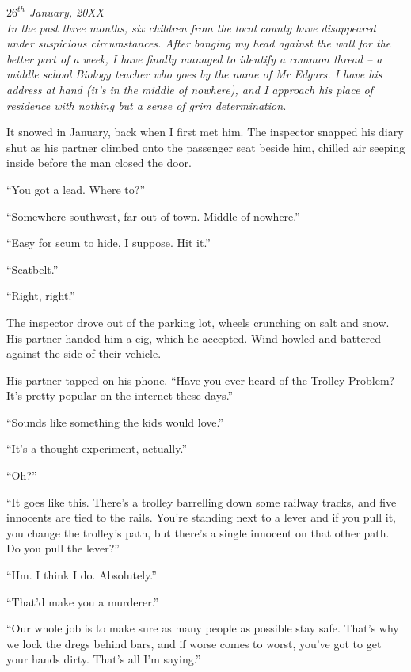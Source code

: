     \emph{$26^{th}$ January, 20XX}\\
    \emph{In the past three months, six children from the local county have disappeared under suspicious circumstances. After banging my head against the wall for the better part of a week, I have finally managed to identify a common thread – a middle school Biology teacher who goes by the name of Mr Edgars. I have his address at hand (it’s in the middle of nowhere), and I approach his place of residence with nothing but a sense of grim determination.}

It snowed in January, back when I first met him. The inspector snapped his diary shut as his partner climbed onto the passenger seat beside him, chilled air seeping inside before the man closed the door. 

“You got a lead. Where to?”

“Somewhere southwest, far out of town. Middle of nowhere.”

“Easy for scum to hide, I suppose. Hit it.”

“Seatbelt.”

“Right, right.”

The inspector drove out of the parking lot, wheels crunching on salt and snow. His partner handed him a cig, which he accepted. Wind howled and battered against the side of their vehicle.

His partner tapped on his phone. “Have you ever heard of the Trolley Problem? It’s pretty popular on the internet these days.”

“Sounds like something the kids would love.”

“It’s a thought experiment, actually.”

“Oh?”

“It goes like this. There’s a trolley barrelling down some railway tracks, and five innocents are tied to the rails. You’re standing next to a lever and if you pull it, you change the trolley’s path, but there’s a single innocent on that other path. Do you pull the lever?”

“Hm. I think I do. Absolutely.”

“That’d make you a murderer.”

“Our whole job is to make sure as many people as possible stay safe. That’s why we lock the dregs behind bars, and if worse comes to worst, you’ve got to get your hands dirty. That’s all I’m saying.”

